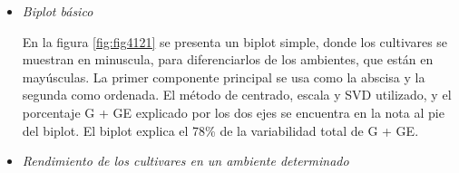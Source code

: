 \begin{itemize}[wide, nosep, labelindent = 0pt, topsep = 1ex, noitemsep,topsep=0pt]
\item \emph{Biplot básico}

En la figura \ref{fig:fig4121} se presenta un biplot simple, donde los cultivares se muestran en minuscula, para diferenciarlos de los ambientes, que están en mayúsculas. La primer componente principal se usa como la abscisa y la segunda como ordenada. El método de centrado, escala y SVD utilizado, y el porcentaje G + GE explicado por los dos ejes se encuentra en la nota al pie del biplot. El biplot explica el 78\% de la variabilidad total de G + GE.




\item \emph{Rendimiento de los cultivares en un ambiente determinado}\\


\end{itemize}
